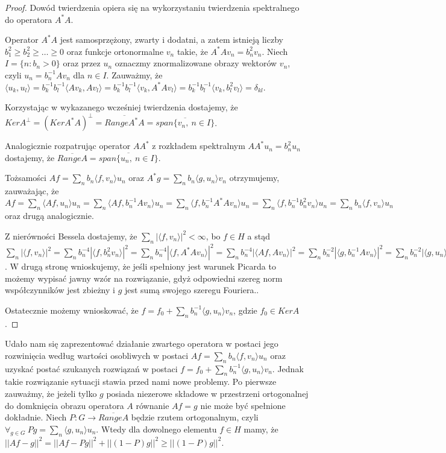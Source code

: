 \documentclass[10pt]{mwart}
\begin{document}
\begin{proof}
Dowód twierdzenia opiera się na wykorzystaniu twierdzenia spektralnego do operatora $A^*A$.

Operator $A^*A$ jest samosprzężony, zwarty i dodatni, a zatem istnieją liczby $b_1^2\geq b_2^2\geq\dots\geq 0$ oraz funkcje ortonormalne $v_n$ takie, że $A^*Av_n=b_n^2v_n$. Niech $I=\{n\colon b_n>0\}$ oraz przez $u_n$ oznaczmy znormalizowane obrazy wektorów $v_n$, czyli $u_n=b_n^{-1}Av_n$ dla $n\in I$. Zauważmy, że $\langle u_k,u_l\rangle=b_k^{-1}b_l^{-1}\langle Av_k, Av_l\rangle=b_k^{-1}b_l^{-1}\langle v_k,A^*Av_l\rangle=b_k^{-1}b_l^{-1}\langle v_k,b_l^2v_l\rangle=\delta_{kl}$.

Korzystając w wykazanego wcześniej twierdzenia dostajemy, że $KerA^{\perp}=(KerA^*A)^{\perp}=\overline{RangeA^*A}=\overline{span\{v_n,\ n\in I\}}$.

Analogicznie rozpatrując operator $AA^*$ z rozkładem spektralnym $AA^*u_n=b_n^2u_n$ dostajemy, że $\overline{RangeA}=\overline{span\{u_n,\ n\in I\}}$.

Tożsamości $Af=\sum_nb_n\langle f, v_n\rangle u_n$ oraz $A^*g=\sum_nb_n\langle g, u_n\rangle v_n$ otrzymujemy, zauważając, że
$Af=\sum_n\langle Af,u_n\rangle u_n=\sum_n\langle Af, b_n^{-1}Av_n\rangle u_n=\sum_n\langle f,b_n^{-1}A^*Av_n\rangle u_n=\sum_n\langle f,b_n^{-1}b_n^2v_n\rangle u_n=\sum_n b_n\langle f,v_n\rangle u_n$ oraz drugą analogicznie.

Z nierówności Bessela dostajemy, że $\sum_n|\langle f, v_n\rangle |^2<\infty$, bo $f\in H$ a stąd
$\sum_n|\langle f,v_n\rangle|^2=\sum_nb_n^{-4}|\langle f,b_n^2v_n\rangle|^2=\sum_nb_n^{-4}|\langle f, A^*Av_n\rangle|^2=\sum_nb_n^{-4}|\langle Af,Av_n\rangle|^2=\sum_nb_n^{-2}|\langle g, b_n^{-1}Av_n\rangle|^2=\sum_nb_n^{-2}|\langle g, u_n\rangle|^2<\infty$. W drugą stronę wnioskujemy, że jeśli spełniony jest warunek Picarda to możemy wypisać jawny wzór na rozwiązanie,  gdyż odpowiedni szereg norm współczynników jest zbieżny i $g$ jest sumą swojego szeregu Fouriera..

Ostatecznie możemy wnioskować, że $f=f_0+\sum_nb_n^{-1}\langle g, u_n\rangle v_n$, gdzie $f_0\in KerA$.
\end{proof}

Udało nam się zaprezentować działanie zwartego operatora w postaci jego rozwinięcia według wartości osobliwych w postaci $Af=\sum_nb_n\langle f, v_n\rangle u_n$ oraz uzyskać postać szukanych rozwiązań w postaci $f=f_0+\sum_nb_n^{-1}\langle g, u_n\rangle v_n$. Jednak takie rozwiązanie sytuacji stawia przed nami nowe problemy. Po pierwsze zauważmy, że jeżeli tylko $g$ posiada niezerowe składowe w przestrzeni ortogonalnej do domknięcia obrazu operatora $A$ równanie $Af=g$ nie może być spełnione dokładnie. Niech $P\colon G\to \overline{RangeA}$ będzie rzutem ortogonalnym, czyli $\forall_{g\in G}\ Pg=\sum_n\langle g,u_n\rangle u_n$. Wtedy dla dowolnego elementu $f\in H$ mamy, że $||Af-g||^2=||Af-Pg||^2+||(1-P)g||^2\geq ||(1-P)g||^2$.
\end{document}
